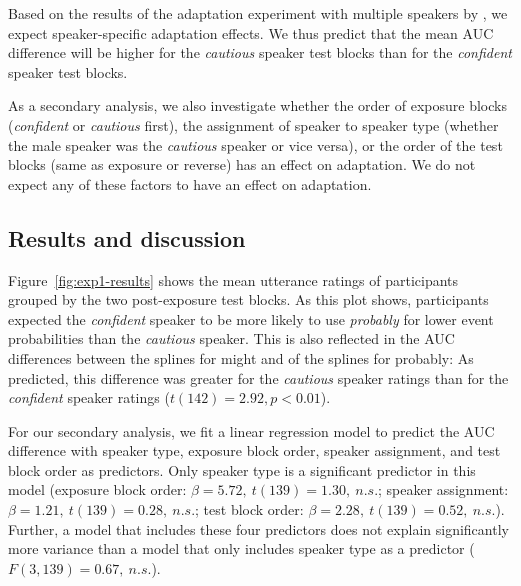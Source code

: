 \documentclass[10pt,letterpaper]{article}
\begin{document}
Based on the results of the adaptation experiment with multiple speakers by ,
we expect speaker-specific adaptation effects. We thus predict that the mean AUC difference
will be higher for the \emph{cautious} speaker test blocks than for the \emph{confident} speaker test blocks.

As a secondary analysis, we also investigate whether the order of exposure blocks 
(\textit{confident} or \textit{cautious} first), the assignment of speaker to speaker type 
(whether the male speaker was the \textit{cautious} speaker or vice versa), or the order 
of the test blocks (same as exposure or reverse) has an effect on adaptation. 
We do not expect any of these factors to have an effect on adaptation.



\subsection{Results and discussion}

Figure~\ref{fig:exp1-results} shows the mean utterance ratings of participants grouped by the two post-exposure test blocks. 
As this plot shows, participants expected the \textit{confident} speaker to be more likely to use \textit{probably} for lower 
event probabilities than the \textit{cautious} speaker. This is also reflected in the AUC differences between the splines for 
{\sc might} and of the splines for {\sc probably}: As predicted, this difference was greater for the  \emph{cautious }speaker 
ratings than for the \emph{confident} speaker ratings ($t(142)=2.92, p < 0.01$).

For our secondary analysis, we fit a linear regression model to predict the AUC difference with speaker type, exposure block order, speaker assignment, and test block order as predictors. Only speaker type is a significant predictor in this model (exposure block order: $\beta=5.72, \ t(139)=1.30, \ n.s.$; speaker assignment: $\beta=1.21, \ t(139)=0.28, \ n.s.$; test block order:  $\beta=2.28, \ t(139)=0.52, \ n.s.$). Further, a model that includes these four predictors does not explain significantly more variance than a model that only includes speaker type as a predictor ($F(3,139)=0.67, \  n.s.$).
\end{document}

